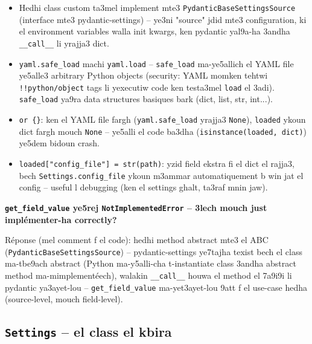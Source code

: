 \documentclass[11pt,a4paper]{report}
\DeclareRobustCommand{\code}[1]{\texttt{#1}}
\begin{document}
\begin{itemize}
  \item Hedhi class custom ta3mel implement mte3 \code{PydanticBaseSettingsSource}
        (interface mte3 pydantic-settings) -- ye3ni "source" jdid mte3 configuration,
        ki el environment variables walla init kwargs, ken pydantic yal9a-ha
        3andha \code{\_\_call\_\_} li yrajja3 dict.
  \item \code{yaml.safe\_load} machi \code{yaml.load} -- \code{safe\_load}
        ma-ye5allich el YAML file ye5alle3 arbitrary Python objects (security:
        YAML momken tehtwi \code{!!python/object} tags li yexecutiw code ken
        testa3mel \code{load} el 3adi). \code{safe\_load} ya9ra data structures
        basiques bark (dict, list, str, int...).
  \item \code{or \{\}}: ken el YAML file fargh (\code{yaml.safe\_load} yrajja3
        \code{None}), \code{loaded} ykoun dict fargh mouch \code{None} -- ye5alli
        el code ba3dha (\code{isinstance(loaded, dict)}) ye5dem bidoun crash.
  \item \code{loaded["config\_file"] = str(path)}: yzid field ekstra fi
        el dict el rajja3, bech \code{Settings.config\_file} ykoun m3ammar
        automatiquement b win jat el config -- useful l debugging (ken el
        settings ghalt, ta3raf mnin jaw).
\end{itemize}

\begin{soual}
\textbf{\code{get\_field\_value} ye5rej \code{NotImplementedError} -- 3lech mouch
just implémenter-ha correctly?}

Réponse (mel comment f el code): hedhi method abstract mte3 el ABC
(\code{PydanticBaseSettingsSource}) -- pydantic-settings ye7tajha texist bech
el class ma-tbe9ach abstract (Python ma-y5alli-cha t-instantiate class
3andha abstract method ma-mimplementéech), walakin \code{\_\_call\_\_} houwa
el method el 7a9i9i li pydantic ya3ayet-lou -- \code{get\_field\_value}
ma-yet3ayet-lou 9att f el use-case hedha (source-level, mouch field-level).
\end{soual}

\subsection{\code{Settings} -- el class el kbira}
\end{document}
